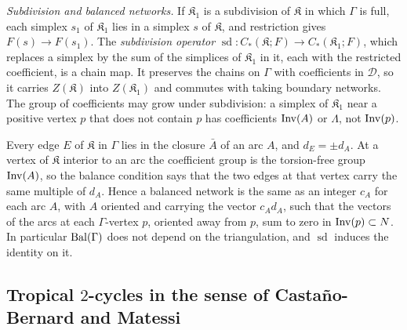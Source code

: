 \emph{Subdivision and balanced networks.} If $\mathfrak K_1$ is a subdivision of $\mathfrak K$ in which $\Gamma$ is full,
each simplex $s_1$ of $\mathfrak K_1$ lies in a simplex $s$ of $\mathfrak K$, and restriction gives $F(s)\to F(s_1)$. The
\emph{subdivision operator} $\operatorname{sd}\colon C_*(\mathfrak K;F)\to C_*(\mathfrak K_1;F)$, which replaces a simplex by
the sum of the simplices of $\mathfrak K_1$ in it, each with the restricted coefficient, is a chain map. It preserves the
chains on $\Gamma$ with coefficients in $\mathcal D$, so it carries $Z(\mathfrak K)$ into $Z(\mathfrak K_1)$ and commutes
with taking boundary networks. The group of coefficients may grow under subdivision: a simplex of $\mathfrak K_1$ near a
positive vertex $p$ that does not contain $p$ has coefficients $\operatorname{Inv}(A)$ or $\Lambda$, not $\operatorname{Inv}(p)$.

Every edge $E$ of $\mathfrak K$ in $\Gamma$ lies in the closure $\bar A$ of an arc $A$, and $d_E=\pm d_A$. At a vertex of $\mathfrak K$ interior to
an arc the coefficient group is the torsion-free group $\operatorname{Inv}(A)$, so the balance condition says that the two edges
at that vertex carry the same multiple of $d_A$. Hence a balanced network is the same as an integer $c_A$ for each
arc $A$, with $A$ oriented and carrying the vector $c_Ad_A$, such that the vectors of the arcs at each $\Gamma$-vertex
$p$, oriented away from $p$, sum to zero in $\operatorname{Inv}(p)\subset N$. In particular $\mathrm{Bal}(\Gamma)$ does not depend on the
triangulation, and $\operatorname{sd}$ induces the identity on it.

\subsection{Tropical \texorpdfstring{$2$}{2}-cycles in the sense of Casta\~no-Bernard and Matessi}\label{ssec:cbm}

